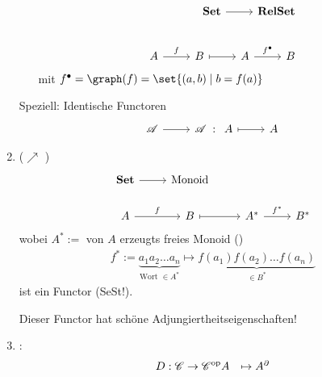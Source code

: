 \begin{beispiel}
\begin{enumerate}
\begin{itemize}
			\begin{align*}
				\begin{tikzcd}[ampersand replacement=\&]
					\Set \arrow[r]                     \& \RelSet                     \\
				\end{tikzcd}\\
				\begin{tikzcd}[ampersand replacement=\&]
					A \arrow[r, "f"] \& B \arrow[r, maps to] \& A \arrow[r, "f^{\bullet}"] \& B
				\end{tikzcd}
			\end{align*}
			mit $f^{\bullet} = \graph(f) = \set{(a,b) \mid b = f(a)}$
		\end{itemize}
		Speziell: Identische Functoren
		\begin{align*}
			\begin{tikzcd}[ampersand replacement=\&]
			\CatA \arrow[r] \& \CatA
			\end{tikzcd}
			\colon
			\begin{tikzcd}[ampersand replacement=\&]
			A \arrow[r, maps to] \& A
			\end{tikzcd}
		\end{align*}
		\item ($\nearrow$ )
			\begin{align*}
				\begin{tikzcd}[ampersand replacement=\&]
				\Set \arrow[r] \& \Monoid\\
				A \arrow[r, "f"] \& B \arrow[r, maps to] \& A^{\ast} \arrow[r, "f^{\ast}"] \& B^{\ast}
				\end{tikzcd}
			\end{align*}
			wobei $A^{\ast}:=$ von $A$ erzeugts freies Monoid ()\\
			\begin{align*}
				f^{\ast} := \underbrace{a_1 a_2 \dots a_n}_{\text{Wort } \in A^{\ast}} \longmapsto
				\underbrace{f(a_1)f(a_2)\dots f(a_n)}_{\in B^{\ast}}
			\end{align*}
			ist ein Functor (SeSt!).
			\begin{bemerkung}
				Dieser Functor hat schöne Adjungiertheitseigenschaften!
			\end{bemerkung}
		\item {}:
		\begin{align*}
			D: \mathscr C \to \mathscr C^{\text{op}} \mit \begin{matrix}
			A &\mapsto A^{\partial}\\

\end{matrix}
\end{align*}
\end{enumerate}
\end{beispiel}
